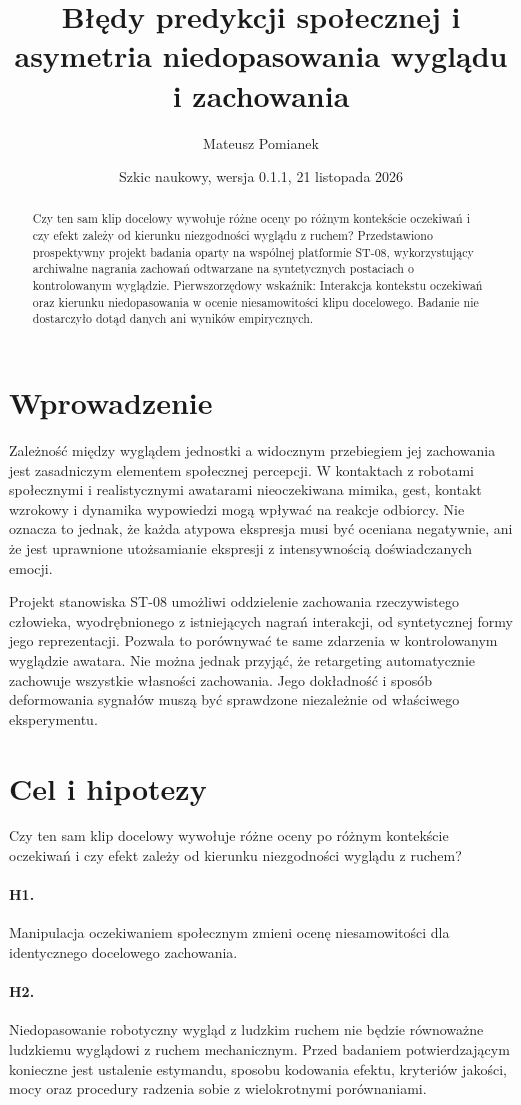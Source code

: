 \documentclass[11pt,a4paper]{article}
\title{Błędy predykcji społecznej i asymetria niedopasowania wyglądu i zachowania}
\author{Mateusz Pomianek}
\date{Szkic naukowy, wersja 0.1.1, 21 listopada 2026}
\begin{document}
\maketitle
\begin{abstract}
Czy ten sam klip docelowy wywołuje różne oceny po różnym kontekście oczekiwań i czy efekt zależy od kierunku niezgodności wyglądu z ruchem? Przedstawiono prospektywny projekt badania oparty na wspólnej platformie ST-08, wykorzystujący archiwalne nagrania zachowań odtwarzane na syntetycznych postaciach o kontrolowanym wyglądzie. Pierwszorzędowy wskaźnik: Interakcja kontekstu oczekiwań oraz kierunku niedopasowania w ocenie niesamowitości klipu docelowego. Badanie nie dostarczyło dotąd danych ani wyników empirycznych.
\end{abstract}
\section{Wprowadzenie}
Zależność między wyglądem jednostki a widocznym przebiegiem jej zachowania jest zasadniczym elementem społecznej percepcji. W kontaktach z robotami społecznymi i realistycznymi awatarami nieoczekiwana mimika, gest, kontakt wzrokowy i dynamika wypowiedzi mogą wpływać na reakcje odbiorcy. Nie oznacza to jednak, że każda atypowa ekspresja musi być oceniana negatywnie, ani że jest uprawnione utożsamianie ekspresji z intensywnością doświadczanych emocji.

Projekt stanowiska ST-08 umożliwi oddzielenie zachowania rzeczywistego człowieka, wyodrębnionego z istniejących nagrań interakcji, od syntetycznej formy jego reprezentacji. Pozwala to porównywać te same zdarzenia w kontrolowanym wyglądzie awatara. Nie można jednak przyjąć, że retargeting automatycznie zachowuje wszystkie własności zachowania. Jego dokładność i sposób deformowania sygnałów muszą być sprawdzone niezależnie od właściwego eksperymentu.
\section{Cel i hipotezy}
Czy ten sam klip docelowy wywołuje różne oceny po różnym kontekście oczekiwań i czy efekt zależy od kierunku niezgodności wyglądu z ruchem?
\paragraph{H1.} Manipulacja oczekiwaniem społecznym zmieni ocenę niesamowitości dla identycznego docelowego zachowania.
\paragraph{H2.} Niedopasowanie robotyczny wygląd z ludzkim ruchem nie będzie równoważne ludzkiemu wyglądowi z ruchem mechanicznym.
Przed badaniem potwierdzającym konieczne jest ustalenie estymandu, sposobu kodowania efektu, kryteriów jakości, mocy oraz procedury radzenia sobie z wielokrotnymi porównaniami.
\end{document}
